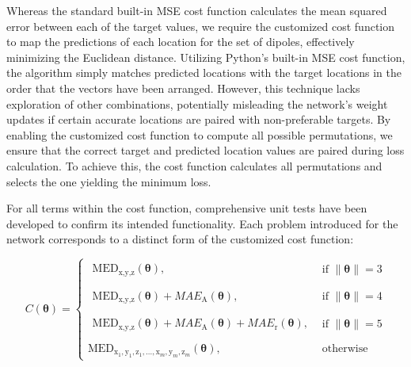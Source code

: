 \documentclass[a4paper, UKenglish, 11pt]{uiomaster}
\begin{document}
Whereas the standard built-in MSE cost function calculates the mean squared error between each of the target values, we require the customized cost function to map the predictions of each location for the set of dipoles, effectively minimizing the Euclidean distance. Utilizing Python's built-in MSE cost function, the algorithm simply matches predicted locations with the target locations in the order that the vectors have been arranged. However, this technique lacks exploration of other combinations, potentially misleading the network's weight updates if certain accurate locations are paired with non-preferable targets. By enabling the customized cost function to compute all possible permutations, we ensure that the correct target and predicted location values are paired during loss calculation. To achieve this, the cost function calculates all permutations and selects the one yielding the minimum loss.

For all terms within the cost function, comprehensive unit tests have been developed to confirm its intended functionality. Each problem introduced for the network corresponds to a distinct form of the customized cost function:

\begin{equation}
    C(\boldsymbol{\theta}) =
    \begin{cases}
      \begin{array}{l}
      \text{MED}_{\text{x,y,z}}(\boldsymbol{\theta}),
      \end{array} & \text{if } \| \boldsymbol{\theta} \| = 3\\
      \\
      \begin{array}{l}
      \text{MED}_{\text{x,y,z}}(\boldsymbol{\theta}) + MAE_{\text{A}}(\boldsymbol{\theta}),
      \end{array} & \text{if } \| \boldsymbol{\theta} \| = 4\\
      \\
      \begin{array}{l}
      \text{MED}_{\text{x,y,z}}(\boldsymbol{\theta}) + MAE_{\text{A}}(\boldsymbol{\theta}) + MAE_{\text{r}}(\boldsymbol{\theta}),
      \end{array} & \text{if } \| \boldsymbol{\theta} \| = 5\\
      \\
      \text{MED}_{\text{x}_1,\text{y}_1,\text{z}_1,\ldots,\text{x}_m,\text{y}_m,\text{z}_m}(\boldsymbol{\theta}), & \text{otherwise}
    \end{cases}
    \label{eq:cost_function}
\end{equation}
\end{document}
